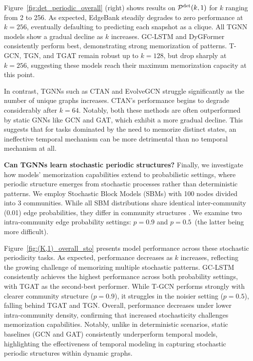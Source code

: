  Figure~\ref{fig:det_periodic_overall} (right) shows results on $\mathcal{P}^\text{det}(k, 1)$ for $k$ ranging from 2 to 256. As expected, EdgeBank steadily degrades to zero performance at $k = 256$, eventually defaulting to predicting each snapshot as a clique. All TGNN models show a gradual decline as $k$ increases. GC-LSTM and DyGFormer consistently perform best, demonstrating strong memorization of patterns. T-GCN, TGN, and TGAT remain robust up to $k = 128$, but drop sharply at $k = 256$, suggesting these models reach their maximum memorization capacity at this point.

 In contrast, TGNNs such as CTAN and EvolveGCN struggle significantly as the number of unique graphs increases. CTAN's performance begins to degrade considerably after $k=64$. Notably, both these methods are often outperformed by static GNNs like GCN and GAT, which exhibit a more gradual decline. This suggests that for tasks dominated by the need to memorize distinct states, an ineffective temporal mechanism can be more detrimental than no temporal mechanism at all.

 \textbf{Can TGNNs learn stochastic periodic structures?} Finally, we investigate how models' memorization capabilities extend to probabilistic settings, where periodic structure emerges from stochastic processes rather than deterministic patterns. 
We employ Stochastic Block Models (SBMs) with 100 nodes divided into 3 communities. While all SBM distributions share identical inter-community (0.01) edge probabilities, they differ in community structures 
. We examine two intra-community edge probability settings: $p=0.9$ and $p=0.5$~(the latter being  more difficult). 

Figure~\ref{fig:(K,1)_overall_sto} presents model performance across these stochastic periodicity tasks. As expected, performance decreases as $k$ increases, reflecting the growing challenge of memorizing multiple stochastic patterns. GC-LSTM consistently achieves the highest performance across both probability settings, with TGAT as the second-best performer. While T-GCN performs strongly with clearer community structure ($p=0.9$), it struggles in the noisier setting ($p=0.5$), falling behind TGAT and TGN. Overall, performance decreases under lower intra-community density, confirming that increased stochasticity challenges memorization capabilities. Notably, unlike in deterministic scenarios, static baselines (GCN and GAT) consistently underperform temporal models, highlighting the effectiveness of temporal modeling in capturing stochastic periodic structures within dynamic graphs.

